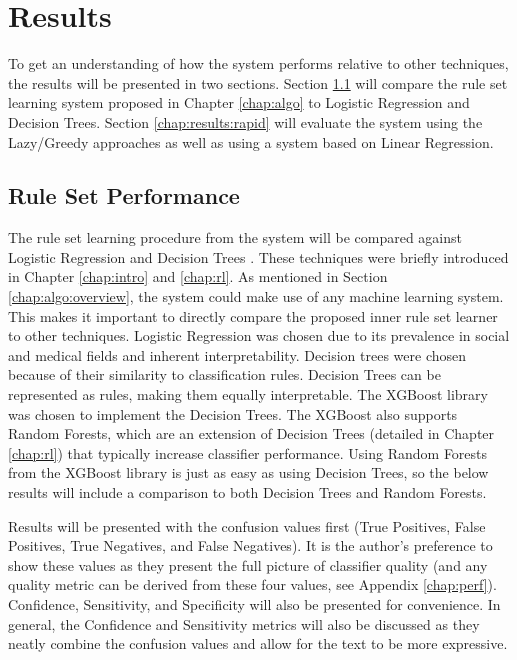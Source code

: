 \chapter{Results} \label{chap:results}

To get an understanding of how the \Abb system performs relative to other techniques, the results will be presented in two sections. Section \ref{chap:results:sets} will compare the rule set learning system proposed in Chapter \ref{chap:algo} to Logistic Regression and Decision Trees. Section \ref{chap:results:rapid} will evaluate the \Abb system using the Lazy/Greedy approaches as well as using a \Abb system based on Linear Regression.


\section{Rule Set Performance}\label{chap:results:sets}

The rule set learning procedure from the \Abb system will be compared against Logistic Regression  \cite{hastie2009elements} and Decision Trees \cite{chen2016xgboost}. These techniques were briefly introduced in Chapter \ref{chap:intro} and \ref{chap:rl}. As mentioned in Section \ref{chap:algo:overview}, the \Abb system could make use of any machine learning system. This makes it important to directly compare the proposed inner rule set learner to other techniques.
Logistic Regression was chosen due to its prevalence in social and medical fields \cite{allegheny2019homeless} \cite{hong2018applications} \cite{toros2019early} and inherent interpretability.
Decision trees were chosen because of their similarity to classification rules. Decision Trees can be represented as rules, making them equally interpretable. The XGBoost library \cite{chen2016xgboost} was chosen to implement the Decision Trees. The XGBoost also supports Random Forests, which are an extension of Decision Trees (detailed in Chapter \ref{chap:rl}) that typically increase classifier performance. Using Random Forests from the XGBoost library is just as easy as using Decision Trees, so the below results will include a comparison to both Decision Trees and Random Forests.

Results will be presented with the confusion values first (True Positives, False Positives, True Negatives, and False Negatives). It is the author's preference to show these values as they present the full picture of classifier quality (and any quality metric can be derived from these four values, see Appendix \ref{chap:perf}). Confidence, Sensitivity, and Specificity will also be presented for convenience. In general, the Confidence and Sensitivity metrics will also be discussed as they neatly combine the confusion values and allow for the text to be more expressive.


